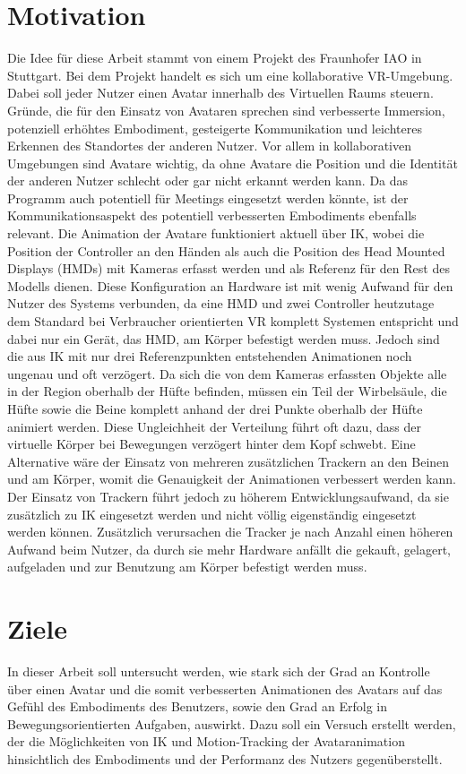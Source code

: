 \section{Motivation}
Die Idee für diese Arbeit stammt von einem Projekt des Fraunhofer IAO in Stuttgart. Bei dem Projekt handelt es sich um eine kollaborative VR-Umgebung. Dabei soll jeder Nutzer einen Avatar innerhalb des Virtuellen Raums steuern. 
Gründe, die für den Einsatz von Avataren sprechen sind verbesserte Immersion, potenziell erhöhtes Embodiment, gesteigerte Kommunikation und leichteres Erkennen des Standortes der anderen Nutzer. Vor allem in kollaborativen Umgebungen sind Avatare wichtig, da ohne Avatare die Position und die Identität der anderen Nutzer schlecht oder gar nicht erkannt werden kann. Da das Programm auch potentiell für Meetings eingesetzt werden könnte, ist der Kommunikationsaspekt des potentiell verbesserten Embodiments ebenfalls relevant. Die Animation der Avatare funktioniert aktuell über IK, wobei die Position der Controller an den Händen als auch die Position des Head Mounted Displays (HMDs) mit Kameras erfasst werden und als Referenz für den Rest des Modells dienen. Diese Konfiguration an Hardware ist mit wenig Aufwand für den Nutzer des Systems verbunden, da eine HMD und zwei Controller heutzutage dem Standard bei Verbraucher orientierten VR komplett Systemen entspricht und dabei nur ein Gerät, das HMD, am Körper befestigt werden muss. Jedoch sind die aus IK mit nur drei Referenzpunkten entstehenden Animationen noch ungenau und oft verzögert. Da sich die von dem Kameras erfassten Objekte alle in der Region oberhalb der Hüfte befinden, müssen ein Teil der Wirbelsäule, die Hüfte sowie die Beine komplett anhand der drei Punkte oberhalb der Hüfte animiert werden. Diese Ungleichheit der Verteilung führt oft dazu, dass der virtuelle Körper bei Bewegungen verzögert hinter dem Kopf schwebt.
Eine Alternative wäre der Einsatz von mehreren zusätzlichen Trackern an den Beinen und am Körper, womit die Genauigkeit der Animationen verbessert werden kann. Der Einsatz von Trackern führt jedoch zu höherem Entwicklungsaufwand, da sie zusätzlich zu IK eingesetzt werden und nicht völlig eigenständig eingesetzt werden können. Zusätzlich verursachen die Tracker je nach Anzahl einen höheren Aufwand beim Nutzer, da durch sie mehr Hardware anfällt die gekauft, gelagert, aufgeladen und zur Benutzung am Körper befestigt werden muss.


\section{Ziele}
In dieser Arbeit soll untersucht werden, wie stark sich der Grad an Kontrolle über einen Avatar und die somit verbesserten Animationen des Avatars auf das Gefühl des Embodiments des Benutzers, sowie den Grad an Erfolg in Bewegungsorientierten Aufgaben, auswirkt. Dazu soll ein Versuch erstellt werden, der die Möglichkeiten von IK und Motion-Tracking der Avataranimation hinsichtlich des Embodiments und der Performanz des Nutzers gegenüberstellt.


